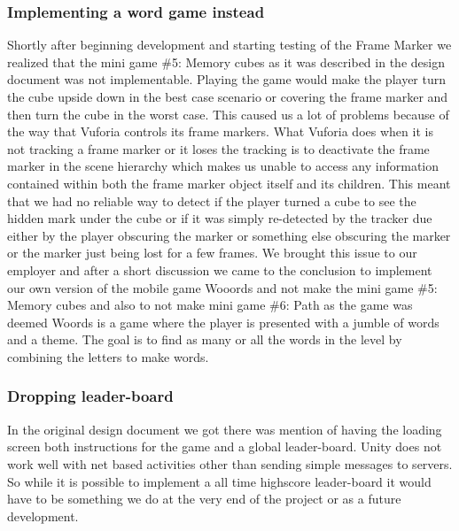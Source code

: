 \subsubsection{Implementing a word game instead}
Shortly after beginning development and starting testing of the \gls{Frame Marker} we realized that the mini game \#5: Memory cubes as it was described in the design document was not implementable. Playing the game would make the player turn the cube upside down in the best case scenario or covering the frame marker and then turn the cube in the worst case. This caused us a lot of problems because of the way that Vuforia controls its frame markers. What Vuforia does when it is not tracking a frame marker or it loses the tracking is to deactivate the frame marker in the scene hierarchy which makes us unable to access any information contained within both the frame marker object itself and its children. This meant that we had no reliable way to detect if the player turned a cube to see the hidden mark under the cube or if it was simply re-detected by the tracker due either by the player obscuring the marker or something else obscuring the marker or the marker just being lost for a few frames. We brought this issue to our employer and after a short discussion we came to the conclusion to implement our own version of the mobile game Wooords and not make the mini game \#5: Memory cubes and also to not make mini game \#6: Path as the game was deemed %
Woords is a game where the player is presented with a jumble of words and a theme. The goal is to find as many or all the words in the level by combining the letters to make words.


\subsubsection{Dropping leader-board}
In the original design document we got there was mention of having the loading screen both instructions for the game and a global leader-board. 
Unity does not work well with net based activities other than sending simple messages to servers.
So while it is possible to implement a all time highscore leader-board it would have to be something we do at the very end of the project or as a future development.

